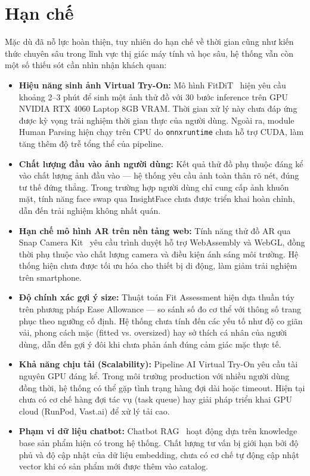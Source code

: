 \section{Hạn chế}
Mặc dù đã nỗ lực hoàn thiện, tuy nhiên do hạn chế về thời gian cũng như kiến thức chuyên sâu trong lĩnh vực thị giác máy tính và học sâu, hệ thống vẫn còn một số thiếu sót cần nhìn nhận khách quan:
\begin{itemize}[noitemsep]
    \item \textbf{Hiệu năng sinh ảnh Virtual Try-On:} Mô hình FitDiT~\cite{fitdit_paper} hiện yêu cầu khoảng 2--3 phút để sinh một ảnh thử đồ với 30 bước inference trên GPU NVIDIA RTX 4060 Laptop 8GB VRAM. Thời gian xử lý này chưa đáp ứng được kỳ vọng trải nghiệm thời gian thực của người dùng. Ngoài ra, module Human Parsing hiện chạy trên CPU do \texttt{onnxruntime} chưa hỗ trợ CUDA, làm tăng thêm độ trễ tổng thể của pipeline.

    \item \textbf{Chất lượng đầu vào ảnh người dùng:} Kết quả thử đồ phụ thuộc đáng kể vào chất lượng ảnh đầu vào --- hệ thống yêu cầu ảnh toàn thân rõ nét, đúng tư thế đứng thẳng. Trong trường hợp người dùng chỉ cung cấp ảnh khuôn mặt, tính năng face swap qua InsightFace chưa được triển khai hoàn chỉnh, dẫn đến trải nghiệm không nhất quán.

    \item \textbf{Hạn chế mô hình AR trên nền tảng web:} Tính năng thử đồ AR qua Snap Camera Kit~\cite{snap_camera_kit_docs} yêu cầu trình duyệt hỗ trợ WebAssembly và WebGL, đồng thời phụ thuộc vào chất lượng camera và điều kiện ánh sáng môi trường. Hệ thống hiện chưa được tối ưu hóa cho thiết bị di động, làm giảm trải nghiệm trên smartphone.

    \item \textbf{Độ chính xác gợi ý size:} Thuật toán Fit Assessment hiện dựa thuần túy trên phương pháp Ease Allowance --- so sánh số đo cơ thể với thông số trang phục theo ngưỡng cố định. Hệ thống chưa tính đến các yếu tố như độ co giãn vải, phong cách mặc (fitted vs. oversized) hay sở thích cá nhân của người dùng, dẫn đến gợi ý đôi khi chưa phản ánh đúng cảm giác mặc thực tế.

    \item \textbf{Khả năng chịu tải (Scalability):} Pipeline AI Virtual Try-On yêu cầu tài nguyên GPU đáng kể. Trong môi trường production với nhiều người dùng đồng thời, hệ thống có thể gặp tình trạng hàng đợi dài hoặc timeout. Hiện tại chưa có cơ chế hàng đợi tác vụ (task queue) hay giải pháp triển khai GPU cloud (RunPod, Vast.ai) để xử lý tải cao.

    \item \textbf{Phạm vi dữ liệu chatbot:} Chatbot RAG~\cite{rag_lewis_2020} hoạt động dựa trên knowledge base sản phẩm hiện có trong hệ thống. Chất lượng tư vấn bị giới hạn bởi độ phủ và độ cập nhật của dữ liệu embedding, chưa có cơ chế tự động cập nhật vector khi có sản phẩm mới được thêm vào catalog.
\end{itemize}
